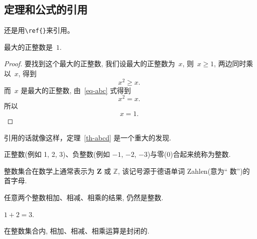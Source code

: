 \subsection{定理和公式的引用}
还是用\verb|\ref{}|来引用。
\begin{theorem}[谁发现的]\label{th-abcd}
最大的正整数是~$1$.
\end{theorem}

\begin{proof}
要找到这个最大的正整数, 我们设最大的正整数为~$x$, 则~$x \geqslant 1$, 两边同时乘以~$x$, 得到
\begin{equation}\label{eq-abc}
x^2 \geqslant x.
\end{equation}
而~$x$ 是最大的正整数, 由~\eqref{eq-abc} 式得到
\[
x^2 = x.
\]
所以
\begin{equation*}
x = 1.
\end{equation*}
\end{proof}

引用的话就像这样，定理~\ref{th-abcd} 是一个重大的发现.

\begin{definition}[整数]
 正整数(例如 1, 2, 3)、负整数(例如 ${−1}$, $−2$, $−3$)与零(0)合起来统称为{\hei 整数}.
\end{definition}

\begin{remark}
  整数集合在数学上通常表示为 $\mathbf{Z}$ 或 $\mathbb{Z}$, 该记号源于德语单词 Zahlen(意为`` 数'')的首字母.
\end{remark}

\begin{proposition}
任意两个整数相加、相减、相乘的结果, 仍然是整数.
\end{proposition}

\begin{example}
  $1+2=3$.
\end{example}

\begin{corollary}
   在整数集合内, 相加、相减、相乘运算是封闭的.
\end{corollary}


